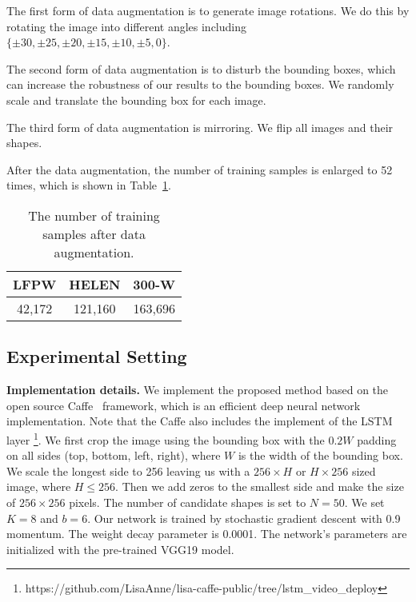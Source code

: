 \documentclass[journal]{IEEEtran}
\begin{document}
The first form of data augmentation is to generate image rotations. We do this by rotating the image into different angles including $\{\pm 30,\pm 25, \pm 20, \pm 15, \pm 10, \pm 5, 0\}$.

The second form of data augmentation is to disturb the bounding boxes, which can increase the robustness of our results to the bounding boxes. We randomly scale and translate the bounding box for each image.


The third form of data augmentation is mirroring. We flip all images and their shapes.

After the data augmentation, the number of training samples is enlarged to 52 times, which is shown in Table~\ref{number_training}.

\begin{table}[h]
\small
    \centering \caption{The number of training samples after data augmentation.}
    \begin{tabular}{|c|c|c|}
         \hline
          LFPW & HELEN & 300-W \\
        \hline
           42,172 & 121,160  & 163,696\\
         \hline
        \end{tabular}
        \label{number_training}
\end{table}

\subsection{Experimental Setting}

\textbf{Implementation details.} We implement the proposed method based on the open source Caffe~\cite{jia2013caffe} framework, which is an efficient deep neural network implementation. Note that the Caffe also includes the implement of the LSTM layer \footnote{https://github.com/LisaAnne/lisa-caffe-public/tree/lstm\_video\_deploy}. We first crop the image using the bounding box with the  $0.2 W$ padding on all sides (top, bottom, left, right), where $W$ is the width of the bounding box. We scale the longest side to 256 leaving us with a $256 \times H$ or $H \times 256$ sized image, where $H \leq 256$. Then we add zeros to the smallest side and make the size of $256 \times 256$ pixels. The number of candidate shapes is set to $N=50$. We set $K=8$ and $b = 6$. Our network is trained by stochastic gradient descent with 0.9 momentum. The weight decay parameter is 0.0001. The network's parameters are initialized with the pre-trained VGG19 model.
\end{document}
